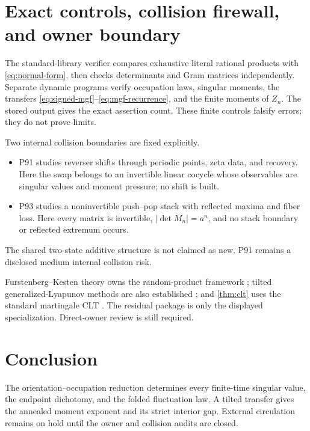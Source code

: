 \documentclass[11pt,a4paper]{amsart}
\theoremstyle{definition}
\theoremstyle{remark}
\begin{document}
\section{Exact controls, collision firewall, and owner boundary}

The standard-library verifier compares exhaustive literal rational products
with \eqref{eq:normal-form}, then checks determinants and Gram matrices
independently.  Separate dynamic programs verify occupation laws, singular
moments, the transfers \eqref{eq:signed-mgf}--\eqref{eq:mgf-recurrence}, and
the finite moments of $Z_n$.  The stored output gives the exact assertion
count.  These finite controls falsify errors; they do not prove limits.

Two internal collision boundaries are fixed explicitly.
\begin{itemize}
\item P91 studies reverser shifts through periodic points, zeta data, and
      recovery.  Here the swap belongs to an invertible linear cocycle whose
      observables are singular values and moment pressure; no shift is built.
\item P93 studies a noninvertible push--pop stack with reflected maxima and
      fiber loss.  Here every matrix is invertible, $|\det M_n|=a^n$, and no
      stack boundary or reflected extremum occurs.
\end{itemize}
The shared two-state additive structure is not claimed as new.  P91 remains
a disclosed medium internal collision risk.

Furstenberg--Kesten theory owns the random-product framework
\cite{FurstenbergKesten1960}; tilted generalized-Lyapunov methods are also
established \cite{Texier2020}; and \cref{thm:clt} uses the standard
martingale CLT \cite{Brown1971}.  The residual package is only the displayed
specialization.  Direct-owner review is still required.

\section{Conclusion}

The orientation--occupation reduction determines every finite-time singular
value, the endpoint dichotomy, and the folded fluctuation law.  A tilted
transfer gives the annealed moment exponent and its strict interior gap.
External circulation remains on hold until the owner and collision audits
are closed.



\end{document}
